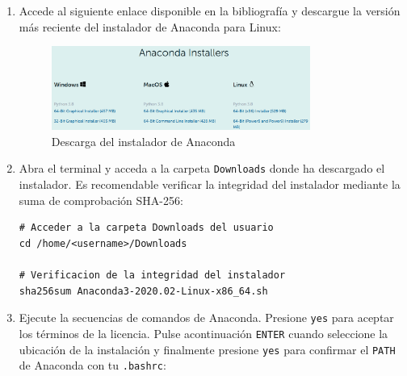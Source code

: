 \begin{enumerate}
    \item Accede al siguiente enlace \cite{inst-conda} disponible en la bibliografía y descargue la versión más reciente del instalador de Anaconda para Linux:
    
    \begin{figure}[ht]
    \centering
    \includegraphics[width=0.8\textwidth]{img/appendix/C/anaconda-installer.png}
    \caption{\label{fig:anaconda-download}Descarga del instalador de Anaconda}
    \end{figure}

    \item Abra el terminal y acceda a la carpeta \texttt{Downloads} donde ha descargado el instalador. Es recomendable verificar la integridad del instalador mediante la suma de comprobación SHA-256:
    
    \vspace{0.5cm}
    
    
\begin{lstlisting}[language=iPython,caption=Verificación de la integridad de la instalación de Anaconda,captionpos=b,label={lst:verificar-sha256}]
# Acceder a la carpeta Downloads del usuario
cd /home/<username>/Downloads

# Verificacion de la integridad del instalador
sha256sum Anaconda3-2020.02-Linux-x86_64.sh
\end{lstlisting}
    
    \item Ejecute la secuencias de comandos de Anaconda. Presione \texttt{yes} para aceptar los términos de la licencia. Pulse acontinuación \texttt{ENTER} cuando seleccione la ubicación de la instalación y finalmente presione \texttt{yes} para confirmar el \texttt{PATH} de Anaconda con tu \texttt{.bashrc}:
    
    \vspace{0.5cm}
    

\end{enumerate}
